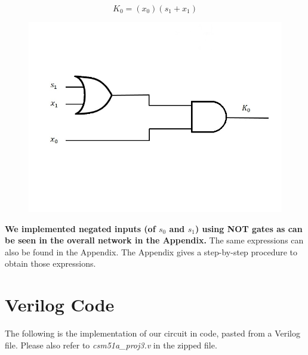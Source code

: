 \documentclass{article}
\begin{document}
\begin{equation*}
K_0 = (x_0)(s_1 + x_1)
\end{equation*}
\begin{figure}[h!]
\centering
\includegraphics[scale=0.3]{K0}
\end{figure}

\textbf{We implemented negated inputs (of $s_0$ and $s_1$) using NOT gates as 
can be seen in the overall network in the Appendix.}
The same expressions can also be found in the Appendix. The Appendix gives a 
step-by-step procedure to obtain those expressions.


\section{Verilog Code}
The following is the implementation of our circuit in code, pasted from a 
Verilog file. Please also refer to \textit{csm51a\_proj3.v} in the zipped 
file.
\end{document}
